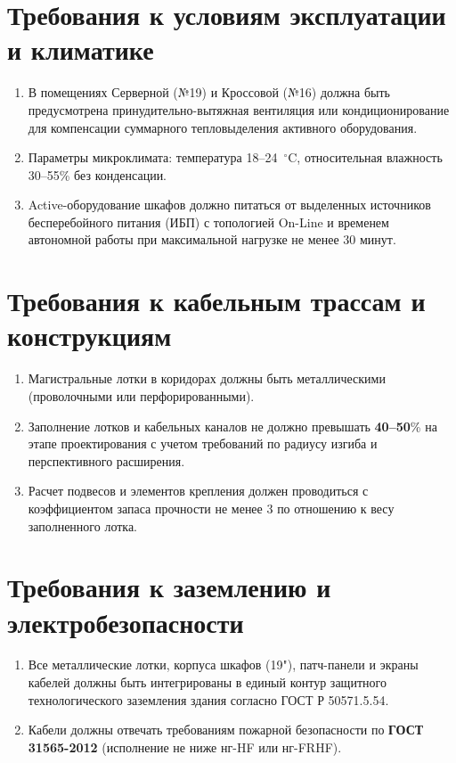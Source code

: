 \documentclass[a4paper,oneside,14pt]{extreport}
\begin{document}
\begin{appendices}
\section{Требования к условиям эксплуатации и климатике}
\begin{enumerate}[label=\arabic{section}.\arabic*]
    \item В помещениях Серверной (№19) и Кроссовой (№16) должна быть предусмотрена принудительно-вытяжная вентиляция или кондиционирование для компенсации суммарного тепловыделения активного оборудования.
    \item Параметры микроклимата: температура 18--24~$^\circ$C, относительная влажность 30--55\% без конденсации.
    \item Active-оборудование шкафов должно питаться от выделенных источников бесперебойного питания (ИБП) с топологией On-Line и временем автономной работы при максимальной нагрузке не менее 30 минут.
\end{enumerate}

\section{Требования к кабельным трассам и конструкциям}
\begin{enumerate}[label=\arabic{section}.\arabic*]
    \item Магистральные лотки в коридорах должны быть металлическими (проволочными или перфорированными).
    \item Заполнение лотков и кабельных каналов не должно превышать \textbf{40--50}\% на этапе проектирования с учетом требований по радиусу изгиба и перспективного расширения.
    \item Расчет подвесов и элементов крепления должен проводиться с коэффициентом запаса прочности не менее 3 по отношению к весу заполненного лотка.
\end{enumerate}

\section{Требования к заземлению и электробезопасности}
\begin{enumerate}[label=\arabic{section}.\arabic*]
    \item Все металлические лотки, корпуса шкафов (19"), патч-панели и экраны кабелей должны быть интегрированы в единый контур защитного технологического заземления здания согласно ГОСТ Р 50571.5.54.
    \item Кабели должны отвечать требованиям пожарной безопасности по \textbf{ГОСТ 31565-2012} (исполнение не ниже нг-HF или нг-FRHF).
\end{enumerate}


\end{appendices}
\end{document}
